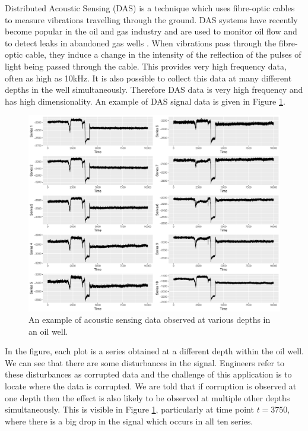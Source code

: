Distributed Acoustic Sensing (DAS) is a technique which uses fibre-optic cables to measure vibrations travelling through the ground. DAS systems have recently become popular in the oil and gas industry  and are used to monitor oil flow \citep{Silkina2014, VanderHorst2014} and to detect leaks in abandoned gas wells \citep{Boone2014}. When vibrations pass through the fibre-optic cable, they induce a change in the intensity of the reflection of the pulses of light being passed through the cable. This provides very high frequency data, often as high as 10kHz. It is also possible to collect this data at many different depths in the well simultaneously. Therefore DAS data is very high frequency and has high dimensionality. An example of DAS signal data is given in Figure \ref{fig:oil_example}.

\begin{figure}[h]
   \centering
   \includegraphics[width = 14cm]{multiplot_wider} 
   \caption{An example of acoustic sensing data observed at various depths in an oil well. }
   \label{fig:oil_example}
 \end{figure}

In the figure, each plot is a series obtained at a different depth within the oil well. We can  see that there are some disturbances in the signal. Engineers refer to these disturbances as corrupted data and the challenge of this application is to locate where the data is corrupted. We are told that if corruption is observed at one depth then the effect is also likely to be observed at multiple other depths simultaneously. This is visible in Figure \ref{fig:oil_example}, particularly at time point $t =  3750$, where there is a big drop in the signal which occurs in all ten series.

